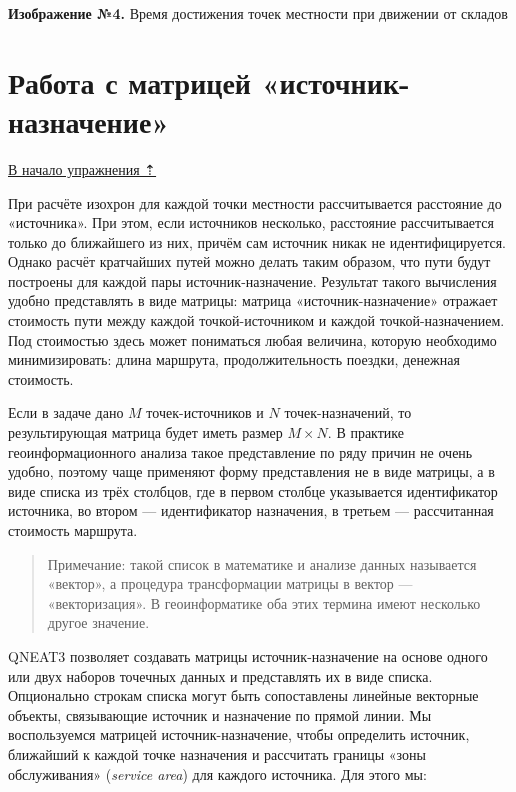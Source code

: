 \documentclass[
  12pt,
]{book}
\begin{document}
\textbf{Изображение №4.} Время достижения точек местности при движении от складов

\hypertarget{networks-matrix}{%
\section{Работа с матрицей «источник-назначение»}\label{networks-matrix}}

\protect\hyperlink{networks}{В начало упражнения ⇡}

При расчёте изохрон для каждой точки местности рассчитывается расстояние до «источника». При этом, если источников несколько, расстояние рассчитывается только до ближайшего из них, причём сам источник никак не идентифицируется. Однако расчёт кратчайших путей можно делать таким образом, что пути будут построены для каждой пары источник-назначение. Результат такого вычисления удобно представлять в виде матрицы: матрица «источник-назначение» отражает стоимость пути между каждой точкой-источником и каждой точкой-назначением. Под стоимостью здесь может пониматься любая величина, которую необходимо минимизировать: длина маршрута, продолжительность поездки, денежная стоимость.

Если в задаче дано \(M\) точек-источников и \(N\) точек-назначений, то результирующая матрица будет иметь размер \(M \times N\). В практике геоинформационного анализа такое представление по ряду причин не очень удобно, поэтому чаще применяют форму представления не в виде матрицы, а в виде списка из трёх столбцов, где в первом столбце указывается идентификатор источника, во втором --- идентификатор назначения, в третьем --- рассчитанная стоимость маршрута.

\begin{quote}
Примечание: такой список в математике и анализе данных называется «вектор», а процедура трансформации матрицы в вектор --- «векторизация». В геоинформатике оба этих термина имеют несколько другое значение.
\end{quote}

QNEAT3 позволяет создавать матрицы источник-назначение на основе одного или двух наборов точечных данных и представлять их в виде списка. Опционально строкам списка могут быть сопоставлены линейные векторные объекты, связывающие источник и назначение по прямой линии. Мы воспользуемся матрицей источник-назначение, чтобы определить источник, ближайший к каждой точке назначения и рассчитать границы «зоны обслуживания» (\emph{service area}) для каждого источника. Для этого мы:
\end{document}

